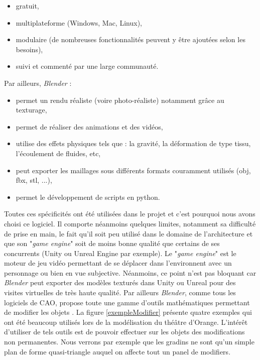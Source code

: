 \begin{itemize}
	\item gratuit,
	\item multiplateforme (Windows, Mac, Linux),
	\item modulaire (de nombreuses fonctionnalités peuvent y être ajoutées selon les besoins),
	\item suivi et commenté par une large communauté.
\end{itemize}
%
Par ailleurs, \textit{Blender} : 
\begin{itemize}
	\item permet un rendu réaliste (voire photo-réaliste) notamment grâce au texturage,
	\item permet de réaliser des animations et des vidéos,
	\item utilise des effets physiques tels que : la gravité, la déformation de type tissu, l'écoulement de fluides, etc,
	\item peut exporter les maillages sous différents formats couramment utilisés (obj, fbx, stl, ...),
	\item permet le développement de scripts en python.
\end{itemize}
%
Toutes ces spécificités ont été utilisées dans le projet et c'est pourquoi nous avons choisi ce logiciel. Il comporte néanmoins quelques limites, notamment sa difficulté de prise en main, le fait qu'il soit peu utilisé dans le domaine de l'architecture et que son "\textit{game engine}" soit de moins bonne qualité que certains de ses concurrents (Unity ou Unreal Engine par exemple). Le "\textit{game engine}" est le moteur de jeu vidéo permettant de se déplacer dans l'environnent avec un personnage ou bien en vue subjective. Néanmoins, ce point n'est pas bloquant car \textit{Blender} peut exporter des modèles texturés dans Unity ou Unreal pour des visites virtuelles de très haute qualité. Par ailleurs \textit{Blender}, comme tous les logiciels de CAO, propose toute une gamme d'outils mathématiques permettant de modifier les objets \cite[Modificateurs]{doc_blender}. La figure \ref{exempleModifier} présente quatre exemples qui ont été beaucoup utilisés lors de la modélisation du théâtre d'Orange. L'intérêt d'utiliser de tels outils est de pouvoir effectuer sur les objets des modifications non permanentes. Nous verrons par exemple que les gradins ne sont qu'un simple plan de forme quasi-triangle auquel on affecte tout un panel de \glspl{modifier}.\\
%
